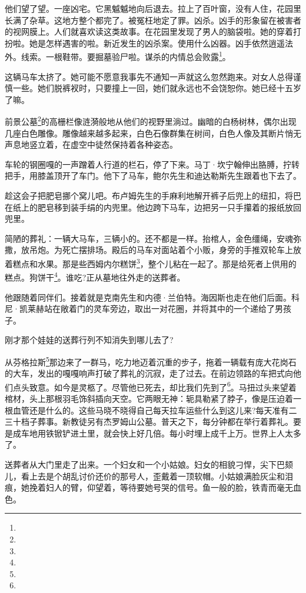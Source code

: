 \par 他们望了望。一座凶宅。它黑魆魆地向后退去。拉上了百叶窗，没有人住，花园里长满了杂草。这地方整个都完了。被冤枉地定了罪。凶杀。凶手的形象留在被害者的视网膜上。人们就喜欢读这类故事。在花园里发现了男人的脑袋啦。她的穿着打扮啦。她是怎样遇害的啦。新近发生的凶杀案。使用什么凶器。凶手依然逍遥法外。线索。一根鞋带。要掘墓验尸啦。谋杀的内情总会败露\footnote{}。
\par 这辆马车太挤了。她可能不愿意我事先不通知一声就这么忽然跑来。对女人总得谨慎一些。她们脱裤衩时，只要撞上一回，她们就永远也不会饶恕你。她已经十五岁了嘛。
\par 前景公墓\footnote{}的高栅栏像涟漪般地从他们的视野里淌过。幽暗的白杨树林，偶尔出现几座白色雕像。雕像越来越多起来，白色石像群集在树间，白色人像及其断片悄无声息地竖立着，在虚空中徒然保持着各种姿态。
\par 车轮的钢圈嘎的一声蹭着人行道的栏石，停了下来。马丁·坎宁翰伸出胳膊，拧转把手，用膝盖顶开了车门。他下了马车，鲍尔先生和迪达勒斯先生跟着也下去了。
\par 趁这会子把肥皂挪个窝儿吧。布卢姆先生的手麻利地解开裤子后兜上的纽扣，将巴在纸上的肥皂移到装手绢的内兜里。他边跨下马车，边把另一只手攥着的报纸放回兜里。
\par 简陋的葬礼：一辆大马车，三辆小的。还不都是一样。抬棺人，金色缰绳，安魂弥撒，放吊炮。为死亡摆排场。殿后的马车对面站着个小贩，身旁的手推双轮车上放着糕点和水果。那是些西姆内尔糕饼\footnote{}，整个儿粘在一起了。那是给死者上供用的糕点。狗饼干\footnote{}。谁吃?正从墓地往外走的送葬者。
\par 他跟随着同伴们。接着就是克南先生和内德·兰伯特。海因斯也走在他们后面。科尼·凯莱赫站在敞着门的灵车旁边，取出一对花圈，并将其中的一个递给了男孩子。
\par 刚才那个娃娃的送葬行列不知消失到哪儿去了?
\par 从芬格拉斯\footnote{}那边来了一群马，吃力地迈着沉重的步子，拖着一辆载有庞大花岗石的大车，发出的嘎嘎响声打破了葬礼的沉寂，走了过去。在前边领路的车把式向他们点头致意。如今是灵柩了。尽管他已死去，却比我们先到了\footnote{}。马扭过头来望着棺材，头上那根羽毛饰斜插向天空。它两眼无神：轭具勒紧了脖子，像是压迫着一根血管还是什么的。这些马晓不晓得自己每天拉车运些什么到这儿来?每天准有二三十档子葬事。新教徒另有杰罗姆山公墓。普天之下，每分钟都在举行着葬礼。要是成车地用铁锨铲进土里，就会快上好几倍。每小时埋上成千上万。世界上人太多了。
\par 送葬者从大门里走了出来。一个妇女和一个小姑娘。妇女的相貌刁悍，尖下巴颏儿，看上去是个胡乱讨价还价的那号人，歪戴着一顶软帽。小姑娘满脸灰尘和泪痕，她挽着妇人的臂，仰望着，等待要她号哭的信号。鱼一般的脸，铁青而毫无血色。
